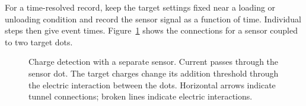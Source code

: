 For a time-resolved record, keep the target settings fixed near a
loading or unloading condition and record the sensor signal as a
function of time. Individual steps then give event times.
Figure~\ref{fig:measurement-sensor-path} shows the connections for
a sensor coupled to two target dots.

\begin{figure}[htbp]
 \centering
 
 \caption{Charge detection with a separate sensor. Current passes
 through the sensor dot. The target charges change its addition
 threshold through the electric interaction between the dots.
 Horizontal arrows indicate tunnel connections; broken lines
 indicate electric interactions.}
 \label{fig:measurement-sensor-path}
\end{figure}
